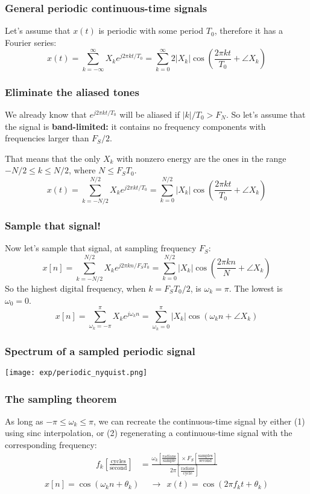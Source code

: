 \documentclass{beamer}
\begin{document}
\begin{frame}
  \frametitle{General periodic continuous-time signals}

  Let's assume that $x(t)$ is periodic with some period $T_0$,
  therefore it has a Fourier series:
  \[
  x(t) = \sum_{k=-\infty}^\infty X_k e^{j2\pi kt/T_0}
  = \sum_{k=0}^\infty 2|X_k|\cos\left(\frac{2\pi kt}{T_0}+\angle X_k\right)
  \]
\end{frame}

\begin{frame}
  \frametitle{Eliminate the aliased tones}

  We already know that $e^{j2\pi kt/T_0}$ will be aliased if $|k|/T_0 >
  F_N$.  So let's assume that the signal is {\bf band-limited:} it
  contains no frequency components with frequencies larger than $F_S/2$.

  That means that the only $X_k$ with nonzero energy are the ones in
  the range $-N/2\le k\le N/2$, where $N\le F_ST_0$.
  \[
  x(t) = \sum_{k=-N/2}^{N/2} X_k e^{j2\pi kt/T_0}
  = \sum_{k=0}^{N/2} |X_k|\cos\left(\frac{2\pi kt}{T_0}+\angle X_k\right)
  \]
\end{frame}

\begin{frame}
  \frametitle{Sample that signal!}

  Now let's sample that signal, at sampling frequency $F_S$:
  \[
  x[n] = \sum_{k=-N/2}^{N/2} X_k e^{j2\pi k n/F_ST_0}
  = \sum_{k=0}^{N/2} |X_k|\cos\left(\frac{2\pi kn}{N}+\angle X_k\right)
  \]
  So the highest digital frequency, when $k=F_ST_0/2$, is
  $\omega_k=\pi$.  The lowest is $\omega_0=0$.  
  \[
  x[n] = \sum_{\omega_k=-\pi}^{\pi} X_k e^{j\omega_k n}
  = \sum_{\omega_k=0}^{\pi} |X_k|\cos\left(\omega_k n+\angle X_k\right)
  \]
\end{frame}

\begin{frame}
  \frametitle{Spectrum of a sampled periodic signal}


  \centerline{\texttt{[image: exp/periodic\_nyquist.png]}}
\end{frame}

\begin{frame}
  \frametitle{The sampling theorem}

  As long as $-\pi\le\omega_k\le \pi$, we can recreate the
  continuous-time signal by either (1) using sinc interpolation, or
  (2) regenerating a continuous-time signal with the corresponding
  frequency:
  \begin{align*}
    f_k \left[\frac{\textrm{cycles}}{\textrm{second}}\right] &=
    \frac{\omega_k \left[\frac{\textrm{radians}}{\textrm{sample}}\right]\times F_S \left[\frac{\textrm{samples}}{\textrm{second}}\right]}{2\pi\left[\frac{\textrm{radians}}{\textrm{cycle}}\right]}
  \end{align*}
  \begin{align*}
    x[n] = \cos(\omega_k n+\theta_k)~~&\rightarrow~~
    x(t) = \cos(2\pi f_k t+\theta_k)
  \end{align*}
\end{frame}
\end{document}
